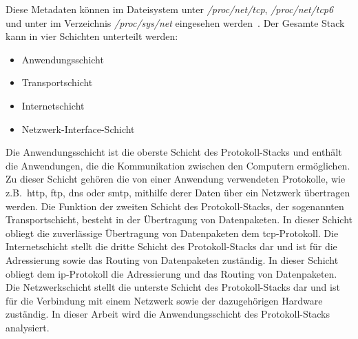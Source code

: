 Diese Metadaten können im Dateisystem unter \textit{/proc/net/tcp}, \textit{/proc/net/tcp6} und unter im Verzeichnis
\textit{/proc/sys/net} eingesehen werden~\cite{tcp-manpage}.\newline
Der Gesamte Stack kann in vier Schichten unterteilt werden:
\begin{itemize}
    \item Anwendungsschicht
    \item Transportschicht
    \item Internetschicht
    \item Netzwerk-Interface-Schicht
\end{itemize}
Die Anwendungsschicht ist die oberste Schicht des Protokoll-Stacks und enthält die Anwendungen,
die die Kommunikation zwischen den Computern ermöglichen.
Zu dieser Schicht gehören die von einer Anwendung verwendeten Protokolle, wie z.B.\ \gls{http}, \gls{ftp}, \gls{dns} oder \gls{smtp},
mithilfe derer Daten über ein Netzwerk übertragen werden.
Die Funktion der zweiten Schicht des Protokoll-Stacks, der sogenannten Transportschicht, besteht in der Übertragung von Datenpaketen.
In dieser Schicht obliegt die zuverlässige Übertragung von Datenpaketen dem \gls{tcp}-Protokoll.
Die Internetschicht stellt die dritte Schicht des Protokoll-Stacks dar und ist für die Adressierung sowie das Routing von Datenpaketen zuständig.
In dieser Schicht obliegt dem \gls{ip}-Protokoll die Adressierung und das Routing von Datenpaketen.
Die Netzwerkschicht stellt die unterste Schicht des Protokoll-Stacks dar und ist für die Verbindung mit einem Netzwerk
sowie der dazugehörigen Hardware zuständig.\newline
In dieser Arbeit wird die Anwendungsschicht des Protokoll-Stacks analysiert.